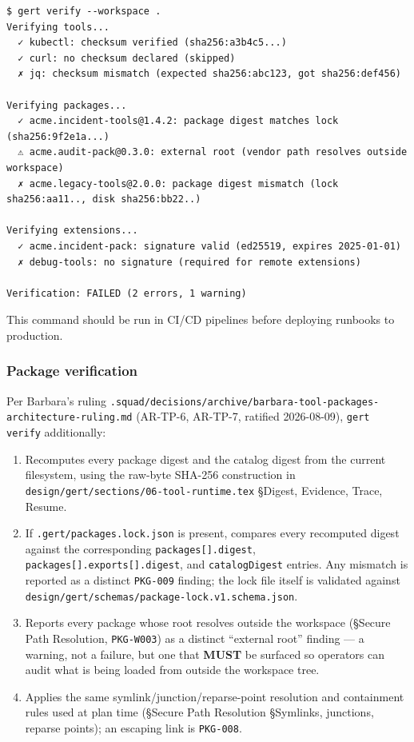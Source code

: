 \begin{verbatim}
$ gert verify --workspace .
Verifying tools...
  ✓ kubectl: checksum verified (sha256:a3b4c5...)
  ✓ curl: no checksum declared (skipped)
  ✗ jq: checksum mismatch (expected sha256:abc123, got sha256:def456)

Verifying packages...
  ✓ acme.incident-tools@1.4.2: package digest matches lock (sha256:9f2e1a...)
  ⚠ acme.audit-pack@0.3.0: external root (vendor path resolves outside workspace)
  ✗ acme.legacy-tools@2.0.0: package digest mismatch (lock sha256:aa11.., disk sha256:bb22..)

Verifying extensions...
  ✓ acme.incident-pack: signature valid (ed25519, expires 2025-01-01)
  ✗ debug-tools: no signature (required for remote extensions)

Verification: FAILED (2 errors, 1 warning)
\end{verbatim}

This command should be run in CI/CD pipelines before deploying runbooks to
production.

\subsubsection{Package verification}
\label{sec:supply-chain-packages}

Per Barbara's ruling
\texttt{.squad/decisions/archive/barbara-tool-packages-architecture-ruling.md}
(AR-TP-6, AR-TP-7, ratified 2026-08-09), \texttt{gert verify} additionally:

\begin{enumerate}
  \item Recomputes every package digest and the catalog digest from the
        current filesystem, using the raw-byte SHA-256 construction in
        \texttt{design/gert/sections/06-tool-runtime.tex} \S Digest,
        Evidence, Trace, Resume.
  \item If \texttt{.gert/packages.lock.json} is present, compares every
        recomputed digest against the corresponding \texttt{packages[].digest},
        \texttt{packages[].exports[].digest}, and \texttt{catalogDigest}
        entries. Any mismatch is reported as a distinct \texttt{PKG-009}
        finding; the lock file itself is validated against
        \texttt{design/gert/schemas/package-lock.v1.schema.json}.
  \item Reports every package whose root resolves outside the workspace
        (\S Secure Path Resolution, \texttt{PKG-W003}) as a distinct
        ``external root'' finding --- a warning, not a failure, but one that
        \textbf{MUST} be surfaced so operators can audit what is being
        loaded from outside the workspace tree.
  \item Applies the same symlink/junction/reparse-point resolution and
        containment rules used at plan time (\S Secure Path Resolution
        \S Symlinks, junctions, reparse points); an escaping link is
        \texttt{PKG-008}.
\end{enumerate}

